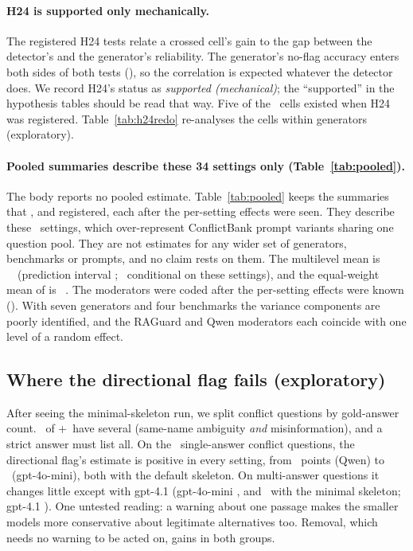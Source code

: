 





\paragraph{H24 is supported only mechanically.} The registered H24 tests relate a crossed cell's gain to the gap
between the detector's and the generator's reliability. The generator's no-flag accuracy enters both sides of both
tests (), so the correlation is expected whatever the detector does. We record H24's status as
\emph{supported (mechanical)}; the ``supported'' in the hypothesis tables should be read that way. Five of the
\hTwentyFourCells\ cells existed when H24 was registered. Table~\ref{tab:h24redo} re-analyses the cells within
generators (exploratory).

\paragraph{Pooled summaries describe these 34 settings only (Table~\ref{tab:pooled}).} The body reports no pooled
estimate. Table~\ref{tab:pooled} keeps the summaries that ,  and  registered, each
after the per-setting effects were seen. They describe these \neuMlK\ settings, which over-represent ConflictBank
prompt variants sharing one question pool. They are not estimates for any wider set of generators, benchmarks or
prompts, and no claim rests on them. The multilevel mean is \neuMlMu\ \neuMlCI\ (prediction interval \neuMlPI;
\neuMlCIDesign\ conditional on these settings), and the equal-weight mean of  is \neuMlEqual\
\neuMlEqualCI. The moderators were coded after the per-setting effects were known (). With seven
generators and four benchmarks the variance components are poorly identified, and the RAGuard and Qwen moderators each
coincide with one level of a random effect.

\subsection{Where the directional flag fails (exploratory)}
\label{app:single}
After seeing the minimal-skeleton run, we split conflict questions by gold-answer count. \nConfMulti\ of
\the\numexpr\nConfMulti+\nConfSingle\relax\ have several (same-name ambiguity \emph{and} misinformation), and a strict
answer must list all. On the \nConfSingle\ single-answer conflict questions, the directional flag's estimate
is positive in every setting, from \yQwenSingleOracleDir\ points (Qwen) to \yMiniSingleOracleDir\ (gpt-4o-mini), both
with the default skeleton. On multi-answer questions it changes little except with gpt-4.1 (gpt-4o-mini
\yMiniMultiOracleDir, and \yMiniMinMultiOracleDir\ with the minimal skeleton; gpt-4.1 \yFourMultiOracleDir). One untested
reading: a warning about one passage makes the smaller models more conservative about legitimate
alternatives too. Removal, which needs no warning to be acted on, gains in both groups.

